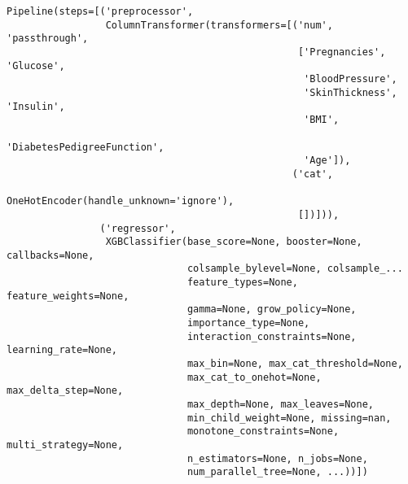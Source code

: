 \documentclass[
  letterpaper,
  DIV=11,
  numbers=noendperiod]{scrreprt}
\begin{document}
\begin{verbatim}
Pipeline(steps=[('preprocessor',
                 ColumnTransformer(transformers=[('num', 'passthrough',
                                                  ['Pregnancies', 'Glucose',
                                                   'BloodPressure',
                                                   'SkinThickness', 'Insulin',
                                                   'BMI',
                                                   'DiabetesPedigreeFunction',
                                                   'Age']),
                                                 ('cat',
                                                  OneHotEncoder(handle_unknown='ignore'),
                                                  [])])),
                ('regressor',
                 XGBClassifier(base_score=None, booster=None, callbacks=None,
                               colsample_bylevel=None, colsample_...
                               feature_types=None, feature_weights=None,
                               gamma=None, grow_policy=None,
                               importance_type=None,
                               interaction_constraints=None, learning_rate=None,
                               max_bin=None, max_cat_threshold=None,
                               max_cat_to_onehot=None, max_delta_step=None,
                               max_depth=None, max_leaves=None,
                               min_child_weight=None, missing=nan,
                               monotone_constraints=None, multi_strategy=None,
                               n_estimators=None, n_jobs=None,
                               num_parallel_tree=None, ...))])
\end{verbatim}
\end{document}
